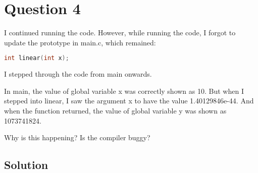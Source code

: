 \section*{Question 4}

I continued running the code.
However, while running the code, I forgot to update the prototype in main.c, which remained:
\begin{lstlisting}[language=C]
int linear(int x);
\end{lstlisting}

I stepped through the code from main onwards.

In main, the value of global variable x was correctly shown as 10.
But when I stepped into linear, I saw the argument x to have the value 1.40129846e-44.
And when the function returned, the value of global variable y was shown as 1073741824.

Why is this happening?
Is the compiler buggy?

\subsection*{Solution}
